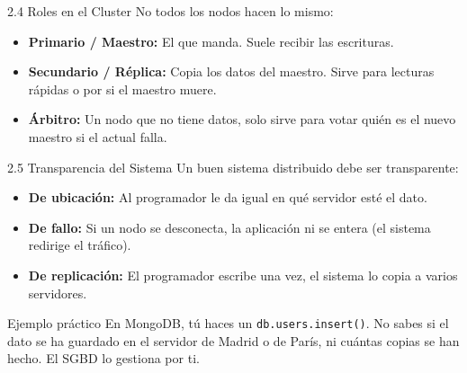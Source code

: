 \begin{frame}{2.4 Roles en el Cluster}
    No todos los nodos hacen lo mismo:
    \begin{itemize}
        \item \textbf{Primario / Maestro:} El que manda. Suele recibir las escrituras.
        \item \textbf{Secundario / Réplica:} Copia los datos del maestro. Sirve para lecturas rápidas o por si el maestro muere.
        \item \textbf{Árbitro:} Un nodo que no tiene datos, solo sirve para votar quién es el nuevo maestro si el actual falla.
    \end{itemize}
\end{frame}

\begin{frame}{2.5 Transparencia del Sistema}
    Un buen sistema distribuido debe ser transparente:
    \begin{itemize}
        \item \textbf{De ubicación:} Al programador le da igual en qué servidor esté el dato.
        \item \textbf{De fallo:} Si un nodo se desconecta, la aplicación ni se entera (el sistema redirige el tráfico).
        \item \textbf{De replicación:} El programador escribe una vez, el sistema lo copia a varios servidores.
    \end{itemize}
    \begin{exampleblock}{Ejemplo práctico}
        En MongoDB, tú haces un \texttt{db.users.insert()}. No sabes si el dato se ha guardado en el servidor de Madrid o de París, ni cuántas copias se han hecho. El SGBD lo gestiona por ti.
    \end{exampleblock}
\end{frame}
